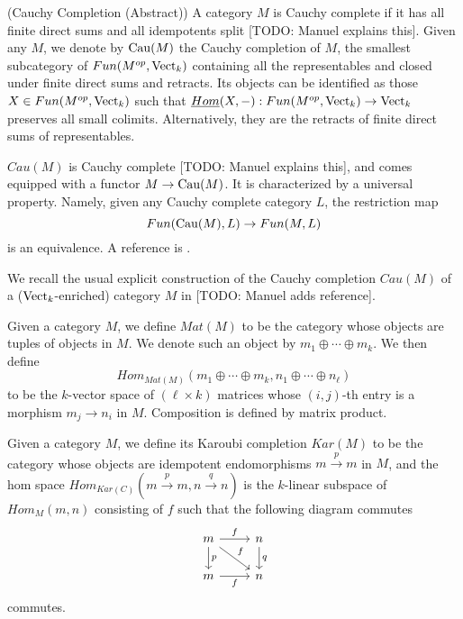 \begin{definition} \label{definition/cauchy-completion/abstract} (Cauchy Completion (Abstract))
  A category $M$ is Cauchy complete if it has all finite direct sums and all
  idempotents split [TODO: Manuel explains this]. Given any $M$, we denote by $\operatorname{Cau}(M)$ the Cauchy
  completion of $M$, the smallest subcategory of $Fun(M^{op},\operatorname{Vect}_k)$
  containing all the representables and closed under finite direct sums and
  retracts. Its objects can be identified as those $X\in Fun(M^{op},\operatorname{Vect}_k)$
  such that $\underline{Hom}(X,-):Fun(M^{op},\operatorname{Vect}_k)\to\operatorname{Vect}_k$ preserves all
  small colimits. Alternatively, they are the retracts of finite direct sums
  of representables.

  $Cau(M)$ is Cauchy complete [TODO: Manuel explains this], and comes equipped with a functor
  $M\to \operatorname{Cau}(M)$. It is characterized by a universal property. Namely, given
  any Cauchy complete category $L$, the restriction
  map $$Fun(\operatorname{Cau}(M),L)\to Fun(M,L)$$ is an equivalence. A reference is
  \cite[Sections 5.5 and 5.7]{kelly/basic-concepts-enriched}.
\end{definition}

\noindent We recall the usual explicit construction of the Cauchy completion $Cau(M)$ of a ($\operatorname{Vect}_k$-enriched) category $M$ in [TODO: Manuel adds reference].

\begin{definition}

Given a category $M$, we define $Mat(M)$ to be the category whose objects are tuples of objects in $M$. We denote such an object by $m_1\oplus\cdots\oplus m_k$. We then define $$Hom_{Mat(M)}(m_1\oplus\cdots\oplus m_k,n_1\oplus\cdots\oplus n_{\ell})$$ to be the $k$-vector space of $(\ell\times k)$ matrices whose $(i,j)$-th entry is a morphism $m_j\to n_i$ in $M$. Composition is defined by matrix product. \end{definition}

\begin{definition}
  Given a category $M$, we define its Karoubi completion $Kar(M)$ to be the category whose objects are idempotent endomorphisms $m \xrightarrow{p} m$ in $M$, and the hom space $Hom_{Kar(C)}(m \xrightarrow{p} m, n \xrightarrow{q} n)$ is the $k$-linear subspace of $Hom_{M}(m,n)$ consisting of $f$ such that the following diagram commutes
  \[\begin{tikzcd}
	m & n \\
	m & n
	\arrow["f", from=1-1, to=1-2]
	\arrow["p", from=1-1, to=2-1]
	\arrow["f", from=1-1, to=2-2]
	\arrow["q", from=1-2, to=2-2]
	\arrow["f"', from=2-1, to=2-2]
\end{tikzcd}\] commutes.\end{definition}


